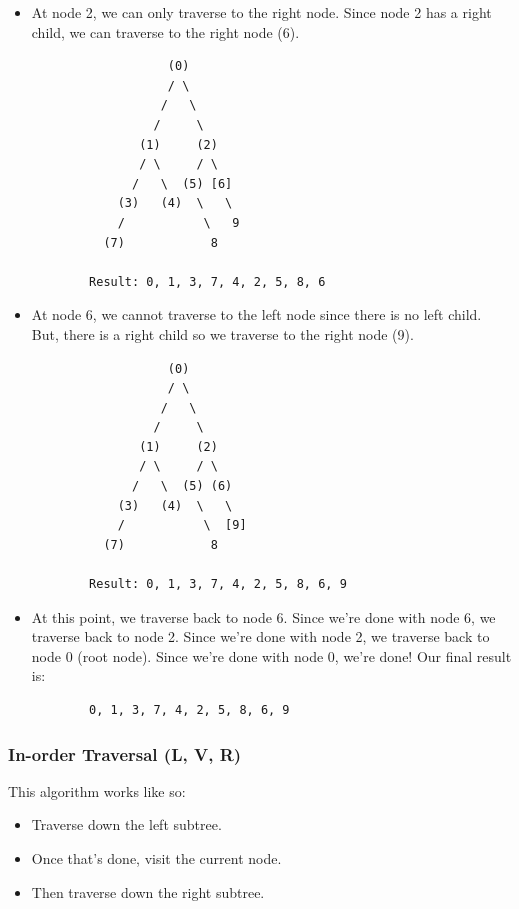 \documentclass[letterpaper]{article}
\begin{document}
\begin{itemize}
\begin{verbatim}
        Result: 0, 1, 3, 7, 4, 2, 5, 8
    \end{verbatim}

    \item At node 2, we can only traverse to the right node. Since node 2 has a right child, we can traverse to the right node (6).
    \begin{verbatim}
                   (0)
                   / \
                  /   \
                 /     \
               (1)     (2)
               / \     / \ 
              /   \  (5) [6]
            (3)   (4)  \   \ 
            /           \   9
          (7)            8

        Result: 0, 1, 3, 7, 4, 2, 5, 8, 6
    \end{verbatim}

    \item At node 6, we cannot traverse to the left node since there is no left child. But, there is a right child so we traverse to the right node (9). 
    \begin{verbatim}
                   (0)
                   / \
                  /   \
                 /     \
               (1)     (2)
               / \     / \ 
              /   \  (5) (6)
            (3)   (4)  \   \ 
            /           \  [9]
          (7)            8

        Result: 0, 1, 3, 7, 4, 2, 5, 8, 6, 9
    \end{verbatim}

    \item At this point, we traverse back to node 6. Since we're done with node 6, we traverse back to node 2. Since we're done with node 2, we traverse back to node 0 (root node). Since we're done with node 0, we're done! Our final result is: 
    \begin{verbatim}
        0, 1, 3, 7, 4, 2, 5, 8, 6, 9
    \end{verbatim}
\end{itemize}

\subsubsection{In-order Traversal (L, V, R)}
This algorithm works like so: 
\begin{itemize}
    \item Traverse down the left subtree. 
    \item Once that's done, visit the current node. 
    \item Then traverse down the right subtree.
\end{itemize}
\end{document}
